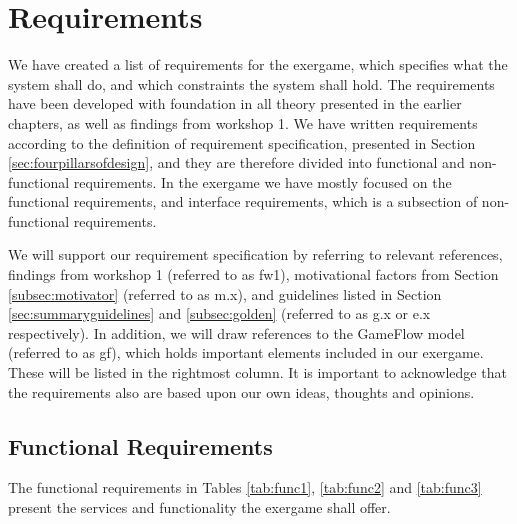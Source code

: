 \section{Requirements}
\label{sec:req}
We have created a list of requirements for the exergame, which specifies what the system shall do, and which constraints the system shall hold. The requirements have been developed with foundation in all theory presented in the earlier chapters, as well as findings from workshop 1. We have written requirements according to the definition of requirement specification, presented in Section \ref{sec:fourpillarsofdesign}, and they are therefore divided into functional and non-functional requirements. In the exergame we have mostly focused on the functional requirements, and interface requirements, which is a subsection of non-functional requirements. 

We will support our requirement specification by referring to relevant references, findings from workshop 1 (referred to as fw1), motivational factors from Section \ref{subsec:motivator} (referred to as m.x), and guidelines listed in Section \ref{sec:summaryguidelines} and \ref{subsec:golden} (referred to as g.x or e.x respectively). In addition, we will draw references to the GameFlow model \cite{sweetser} (referred to as gf), which holds important elements included in our exergame. These will be listed in the rightmost column. It is important to acknowledge that the requirements also are based upon our own ideas, thoughts and opinions. 

\subsection{Functional Requirements}
The functional requirements in Tables \ref{tab:func1}, \ref{tab:func2} and \ref{tab:func3} present the services and functionality the exergame shall offer.

